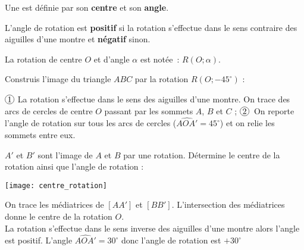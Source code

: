 
\begin{aconnaitre}
Une  est définie par son \textbf{centre} et son \textbf{angle}.

L'angle de rotation est \textbf{positif} si la rotation s'effectue dans le sens contraire des aiguilles d'une montre et \textbf{négatif} sinon.
\end{aconnaitre}

\begin{remarque}
La rotation de centre $O$ et d'angle $\alpha$ est notée : $R(O ; \alpha)$.
 \end{remarque}

\begin{methode*1}[La rotation]

 \begin{exemple*1}
 Construis l'image du triangle $ABC$ par la rotation $R(O ; - 45^\circ)$ :
 

\textcolor{H1}{$\circled{1}$} La rotation s'effectue dans le sens des aiguilles d'une montre. On trace des arcs de cercles de centre $O$ passant par les sommets $A$, $B$ et $C$ ;
\textcolor{H1}{$\circled{2}$} On reporte l'angle de rotation sur tous les arcs de cercles ($\widehat{AOA'} = 45^\circ$) et on relie les sommets entre eux.
 \end{exemple*1}
 
\begin{exemple*1}
$A'$ et $B'$ sont l'image de $A$ et $B$ par une rotation. Détermine le centre de la rotation ainsi que l'angle de rotation :

\begin{minipage}[c]{0.44\linewidth}
\texttt{[image: centre\_rotation]}
 \end{minipage} \hfill%
 \begin{minipage}[c]{0.52\linewidth}
On trace les médiatrices de $[AA']$ et $[BB']$. L'intersection des médiatrices donne le centre de la rotation $O$. \\[0.5em]
La rotation s'effectue dans le sens inverse des aiguilles d'une montre alors l'angle est positif. L'angle $\widehat{AOA'} = 30^\circ$ donc l'angle de rotation est $+ 30^\circ$
 \end{minipage} \\ 
 \end{exemple*1}


\end{methode*1}
